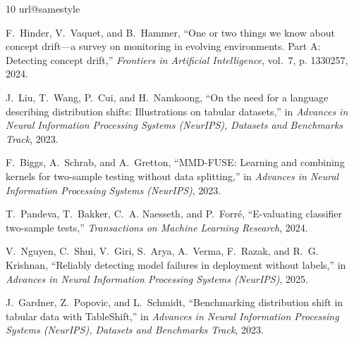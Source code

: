 \documentclass[conference]{IEEEtran}
\theoremstyle{plainhead}
\begin{document}
\balance
\begin{thebibliography}{10}
\providecommand{\url}[1]{#1}
\csname url@samestyle\endcsname
\providecommand{\newblock}{\relax}
\providecommand{\bibinfo}[2]{#2}
\providecommand{\BIBentrySTDinterwordspacing}{\spaceskip=0pt\relax}
\providecommand{\BIBentryALTinterwordstretchfactor}{4}
\providecommand{\BIBentryALTinterwordspacing}{\spaceskip=\fontdimen2\font plus
\BIBentryALTinterwordstretchfactor\fontdimen3\font minus
  \fontdimen4\font\relax}
\providecommand{\BIBforeignlanguage}[2]{{%
\expandafter\ifx\csname l@#1\endcsname\relax
\typeout{** WARNING: IEEEtran.bst: No hyphenation pattern has been}%
\typeout{** loaded for the language `#1'. Using the pattern for}%
\typeout{** the default language instead.}%
\else
\language=\csname l@#1\endcsname
\fi
#2}}
\providecommand{\BIBdecl}{\relax}
\BIBdecl

F.~Hinder, V.~Vaquet, and B.~Hammer, ``One or two things we know about concept
  drift---a survey on monitoring in evolving environments. {P}art {A}:
  Detecting concept drift,'' \emph{Frontiers in Artificial Intelligence},
  vol.~7, p. 1330257, 2024.

J.~Liu, T.~Wang, P.~Cui, and H.~Namkoong, ``On the need for a language
  describing distribution shifts: Illustrations on tabular datasets,'' in
  \emph{Advances in Neural Information Processing Systems (NeurIPS), Datasets
  and Benchmarks Track}, 2023.

F.~Biggs, A.~Schrab, and A.~Gretton, ``{MMD-FUSE}: Learning and combining
  kernels for two-sample testing without data splitting,'' in \emph{Advances in
  Neural Information Processing Systems (NeurIPS)}, 2023.

T.~Pandeva, T.~Bakker, C.~A. Naesseth, and P.~Forr{\'e}, ``E-valuating
  classifier two-sample tests,'' \emph{Transactions on Machine Learning
  Research}, 2024.

V.~Nguyen, C.~Shui, V.~Giri, S.~Arya, A.~Verma, F.~Razak, and R.~G. Krishnan,
  ``Reliably detecting model failures in deployment without labels,'' in
  \emph{Advances in Neural Information Processing Systems (NeurIPS)}, 2025.

J.~Gardner, Z.~Popovic, and L.~Schmidt, ``Benchmarking distribution shift in
  tabular data with {TableShift},'' in \emph{Advances in Neural Information
  Processing Systems (NeurIPS), Datasets and Benchmarks Track}, 2023.


\end{thebibliography}
\end{document}
